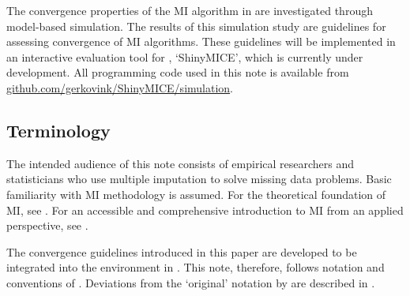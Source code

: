 \documentclass[article]{jss}
\begin{document}

The convergence properties of the MI algorithm in  are investigated through model-based simulation. The results of this simulation study are guidelines for assessing convergence of MI algorithms. These guidelines will be implemented in an interactive evaluation tool for , `ShinyMICE', which is currently under development. All programming code used in this note is available from \href{https://github.com/gerkovink/shinyMice/simulation}{github.com/gerkovink/ShinyMICE/simulation}. 


\subsection{Terminology} \label{sec:terms}

The intended audience of this note consists of empirical researchers and statisticians who use multiple imputation to solve missing data problems. Basic familiarity with MI methodology is assumed. For the theoretical foundation of MI, see \cite{rubin87}. For an accessible and comprehensive introduction to MI from an applied perspective, see \cite{buur18}.  

The convergence guidelines introduced in this paper are developed to be integrated into the  environment \citep{mice} in  \citep{R}. This note, therefore, follows notation and conventions of \cite{mice}. Deviations from the `original' notation by \cite{rubin87} are described in \citep[\S~2.2.3]{buur18}. 
\end{document}
